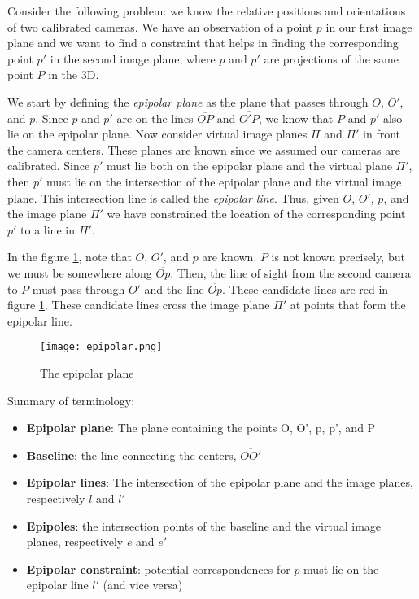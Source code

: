 \documentclass[twoside]{article}
\begin{document}
Consider the following problem: we know the relative positions and orientations of two calibrated cameras. We have an observation of a point $p$ in our first image plane and we want to find a constraint that helps in finding the corresponding point $p'$ in the second image plane, where $p$ and $p'$ are projections of the same point $P$ in the 3D.

We start by defining the \emph{epipolar plane} as the plane that passes through $O$, $O'$, and $p$. Since $p$ and $p'$ are on the lines $\overline{OP}$ and $\overline{O'P}$, we know that $P$ and $p'$ also lie on the epipolar plane. Now consider virtual image planes $\Pi$ and $\Pi'$ in front the camera centers. These planes are known since we assumed our cameras are calibrated. Since $p'$ must lie both on the epipolar plane and the virtual plane $\Pi'$, then $p'$ must lie on the intersection of the epipolar plane and the virtual image plane. This intersection line is called the \emph{epipolar line}. Thus, given $O$, $O'$, $p$, and the image plane $\Pi'$ we have constrained the location of the corresponding point $p'$ to a line in $\Pi'$.

In the figure \ref{epi}, note that $O$, $O'$, and $p$ are known. $P$ is not known precisely, but we must be somewhere along $\overline{Op}$. Then, the line of sight from the second camera to $P$ must pass through $O'$ and the line $\overline{Op}$. These candidate lines are red in figure \ref{epi}. These candidate lines cross the image plane $\Pi'$ at points that form the epipolar line.

\begin{figure}[h!]
  \begin{center}
	\texttt{[image: epipolar.png]}
  \end{center}
  \caption{The epipolar plane}
  \label{epi}
\end{figure}

Summary of terminology:
\begin{itemize}
\item \textbf{Epipolar plane}: The plane containing the points O, O', p, p', and P
\item \textbf{Baseline}: the line connecting the centers, $\overline{OO'}$
\item \textbf{Epipolar lines}: The intersection of the epipolar plane and the image planes, respectively $l$ and $l'$
\item \textbf{Epipoles}: the intersection points of the baseline and the virtual image planes, respectively $e$ and $e'$
\item \textbf{Epipolar constraint}: potential correspondences for $p$ must lie on the epipolar line $l'$ (and vice versa)
\end{itemize}
\end{document}
